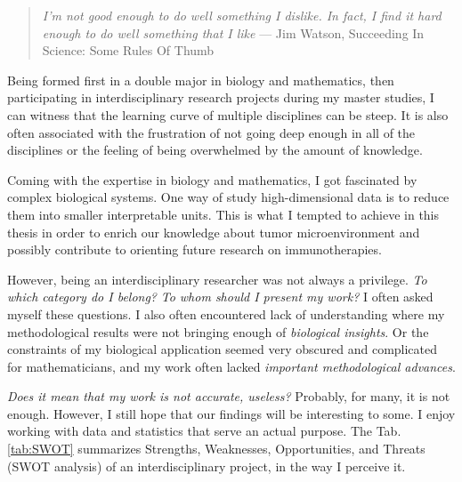 \documentclass[12pt,]{book}
\theoremstyle{definition}
\theoremstyle{definition}
\theoremstyle{definition}
\theoremstyle{remark}
\begin{document}
\begin{quote}
\emph{I'm not good enough to do well something I dislike. In fact, I
find it hard enough to do well something that I like} --- Jim Watson,
Succeeding In Science: Some Rules Of Thumb \citep{Csermely2007}
\end{quote}

Being formed first in a double major in biology and mathematics, then
participating in interdisciplinary research projects during my master
studies, I can witness that the learning curve of multiple disciplines
can be steep. It is also often associated with the frustration of not
going deep enough in all of the disciplines or the feeling of being
overwhelmed by the amount of knowledge.

Coming with the expertise in biology and mathematics, I got fascinated
by complex biological systems. One way of study high-dimensional data is
to reduce them into smaller interpretable units. This is what I tempted
to achieve in this thesis in order to enrich our knowledge about tumor
microenvironment and possibly contribute to orienting future research on
immunotherapies.

However, being an interdisciplinary researcher was not always a
privilege. \emph{To which category do I belong?} \emph{To whom should I
present my work?} I often asked myself these questions. I also often
encountered lack of understanding where my methodological results were
not bringing enough of \emph{biological insights}. Or the constraints of
my biological application seemed very obscured and complicated for
mathematicians, and my work often lacked \emph{important methodological
advances}.

\emph{Does it mean that my work is not accurate, useless?} Probably, for
many, it is not enough. However, I still hope that our findings will be
interesting to some. I enjoy working with data and statistics that serve
an actual purpose. The Tab. \ref{tab:SWOT} summarizes Strengths,
Weaknesses, Opportunities, and Threats (SWOT analysis) of an
interdisciplinary project, in the way I perceive it.
\end{document}
